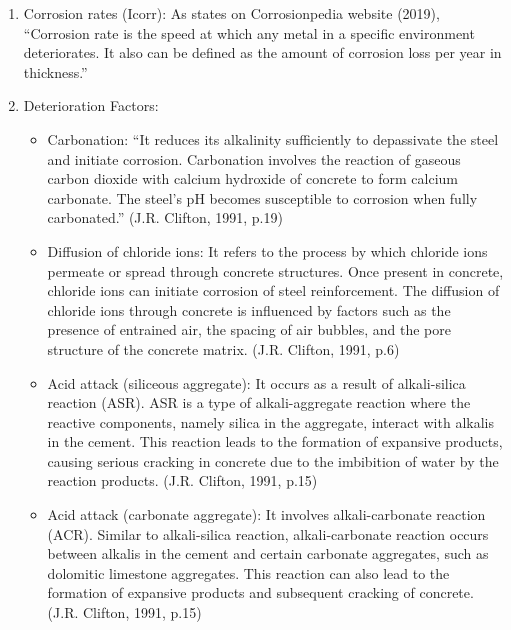\documentclass[12pt]{article}
\begin{document}
\begin{enumerate}
    \item Corrosion rates (Icorr): As states on Corrosionpedia \cite{corrosionpedia} website (2019), “Corrosion rate is the speed at which any metal in a specific environment deteriorates. It also can be defined as the amount of corrosion loss per year in thickness.”

    \item Deterioration Factors:
    \begin{itemize}
        \item Carbonation: “It reduces its alkalinity sufficiently to depassivate the steel and initiate corrosion. Carbonation involves the reaction of gaseous carbon dioxide with calcium hydroxide of concrete to form calcium carbonate. The steel's pH becomes susceptible to corrosion when fully carbonated.” (J.R. Clifton, 1991, p.19)\cite{concrete_life}
    \end{itemize}
    \begin{itemize}
        \item Diffusion of chloride ions: It refers to the process by which chloride ions permeate or spread through concrete structures. Once present in concrete, chloride ions can initiate corrosion of steel reinforcement. The diffusion of chloride ions through concrete is influenced by factors such as the presence of entrained air, the spacing of air bubbles, and the pore structure of the concrete matrix. (J.R. Clifton, 1991, p.6)\cite{concrete_life}
    \end{itemize}
    \begin{itemize}
        \item Acid attack (siliceous aggregate): It occurs as a result of alkali-silica reaction (ASR). ASR is a type of alkali-aggregate reaction where the reactive components, namely silica in the aggregate, interact with alkalis in the cement. This reaction leads to the formation of expansive products, causing serious cracking in concrete due to the imbibition of water by the reaction products. (J.R. Clifton, 1991, p.15)\cite{concrete_life}
    \end{itemize}
    \begin{itemize}
        \item Acid attack (carbonate aggregate): It involves alkali-carbonate reaction (ACR). Similar to alkali-silica reaction, alkali-carbonate reaction occurs between alkalis in the cement and certain carbonate aggregates, such as dolomitic limestone aggregates. This reaction can also lead to the formation of expansive products and subsequent cracking of concrete.(J.R. Clifton, 1991, p.15)\cite{concrete_life}

\end{itemize}
\end{enumerate}
\end{document}
